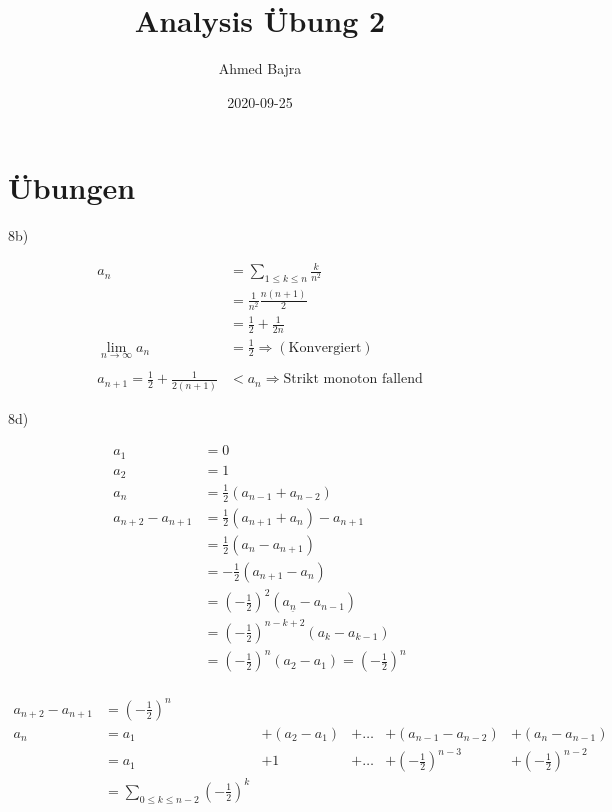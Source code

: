 \documentclass{article}
\title{Analysis Übung 2}
\author{Ahmed Bajra}
\date{2020-09-25}
\begin{document}
    \maketitle

    \section{Übungen}
    8b)

    \begin{align*}
        a_n & =  \sum_{1\leq k\leq n}\frac{k}{n^2} \\
        & =  \frac{1}{n^2}\frac{n(n+1)}{2}\\
        & =  \frac12 + \frac1{2n}\\
        \lim_{n\rightarrow\infty}a_n & =  \frac12 \Rightarrow (\text{Konvergiert}) \\
        \\
        a_{n+1} = \frac12 + \frac{1}{2(n+1)} & <  a_n \Rightarrow  \text{Strikt monoton fallend}
    \end{align*}

    8d)

    \begin{align*}
        a_1&=0\\
        a_2&=1\\
        a_n&=\frac12(a_{n-1}+a_{n-2})\\
        a_{n+2}-a_{n+1} &= \frac12(a_{n+1}+a_n) - a_{n+1}\\
        &= \frac12(a_n - a_{n+1})\\
        &= -\frac12(a_{n+1} -a_n) \\
        &= \left(-\frac12\right)^2(a_{\underline{n}}-a_{n-1}) \\
        &= \left(-\frac12\right)^{n-k+2}(a_{k}-a_{k-1}) \\
        &= \left(-\frac12\right)^{n}(a_{2}-a_{1}) = \left(-\frac12\right)^{n} \\
    \end{align*}

    \newpage

    \begin{align*}
        a_{n+2}-a_{n+1} &= \left(-\frac12\right)^{n} \\
        a_n &= a_1 &+ (a_2 - a_1) &+ \dots &+ (a_{n-1} - a_{n-2}) &+ (a_n - a_{n-1})\\
        &= a_1 &+ 1 &+ \dots &+  \left(-\frac12\right)^{n-3} &+  \left(-\frac12\right)^{n-2}\\
        &= \sum_{0\leq k \leq n-2}\left(-\frac12\right)^{k} 
    \end{align*}
\end{document}
